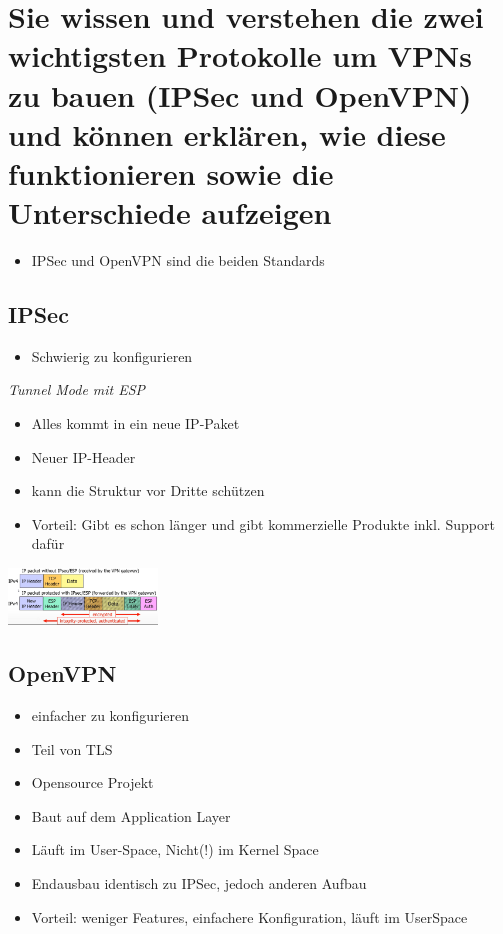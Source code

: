 \documentclass{report}
\newenvironment{Figure}
	{\par\medskip\noindent\minipage{\linewidth}}
	{\endminipage\par\medskip}
\theoremstyle{definition}
\theoremstyle{example}
\begin{document}
\section{Sie wissen und verstehen die zwei wichtigsten Protokolle um VPNs zu bauen (IPSec und OpenVPN) und können erklären, wie diese funktionieren sowie die Unterschiede aufzeigen}
\begin{itemize}
	\item IPSec und OpenVPN sind die beiden Standards
\end{itemize}


	\subsection{IPSec}
\begin{itemize}
	\item Schwierig zu konfigurieren
\end{itemize}

\textit{Tunnel Mode mit ESP}
\begin{itemize}
	\item Alles kommt in ein neue IP-Paket
	\item Neuer IP-Header
	\item kann die Struktur vor Dritte schützen
	\item Vorteil: Gibt es schon länger und gibt kommerzielle Produkte inkl. Support dafür
\end{itemize}

\begin{Figure}
\centering
\includegraphics[width=150px]{img/vpnIpSecTunnelModeESP.png}
	\label{fig:Abbildung über das Schema für VPN Tunnel Mode über ESP}
\end{Figure}


	\subsection{OpenVPN}
\begin{itemize}
	\item einfacher zu konfigurieren
	\item Teil von TLS
	\item Opensource Projekt
	\item Baut auf dem Application Layer
	\item Läuft im User-Space, Nicht(!) im Kernel Space
	\item Endausbau identisch zu IPSec, jedoch anderen Aufbau
	\item Vorteil: weniger Features, einfachere Konfiguration, läuft im UserSpace
\end{itemize}
\end{document}
